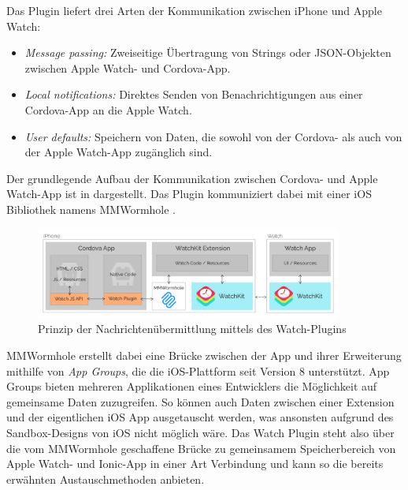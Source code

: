 Das Plugin liefert drei Arten der Kommunikation zwischen iPhone und Apple Watch:
\begin{itemize}
    \item \emph{Message passing:} Zweiseitige Übertragung von Strings oder JSON-Objekten zwischen Apple Watch- und Cordova-App.
    \item \emph{Local notifications:} Direktes Senden von Benachrichtigungen aus einer Cordova-App an die Apple Watch.
    \item \emph{User defaults:} Speichern von Daten, die sowohl von der Cordova- als auch von der Apple Watch-App zugänglich sind.
\end{itemize}
%
Der grundlegende Aufbau der Kommunikation zwischen Cordova- und Apple Watch-App ist in  dargestellt. Das Plugin kommuniziert dabei mit einer iOS Bibliothek namens MMWormhole \cite{gitMMWormhole}.
%
\begin{figure}[!htb] 
	\centering
	\includegraphics[width=0.9\textwidth]{data/bilder/apple-watch-plugin.png}
	\caption{Prinzip der Nachrichtenübermittlung mittels des Watch-Plugins \cite{CrossleyCordovaAppleWatchPlugin}}
	\label{fig:watchPlugin}
\end{figure}
%
MMWormhole erstellt dabei eine Brücke zwischen der App und ihrer Erweiterung mithilfe von \emph{App Groups}, die die iOS-Plattform seit Version 8 unterstützt. App Groups bieten mehreren Applikationen eines Entwicklers die Möglichkeit auf gemeinsame Daten zuzugreifen. So können auch Daten zwischen einer Extension und der eigentlichen iOS App ausgetauscht werden, was ansonsten aufgrund des Sandbox-Designs von iOS nicht möglich wäre. Das Watch Plugin steht also über die vom MMWormhole geschaffene Brücke zu gemeinsamem Speicherbereich von Apple Watch- und Ionic-App in einer Art Verbindung und kann so die bereits erwähnten Austauschmethoden anbieten.
%
%
